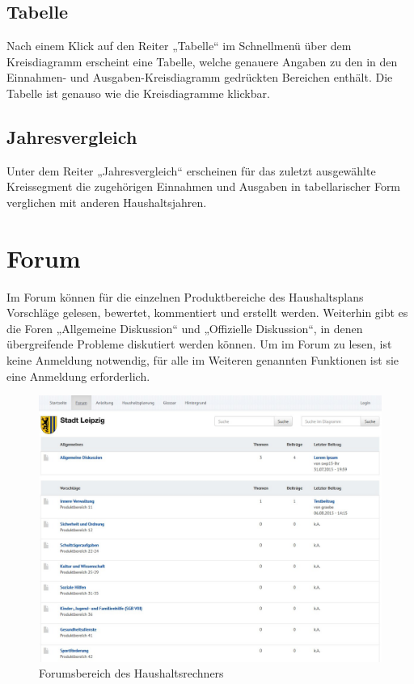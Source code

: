 \documentclass[a4paper,11pt,twoside]{article}
\begin{document}
\subsection{Tabelle}
Nach einem Klick auf den Reiter „Tabelle“ im Schnellmenü über dem
Kreisdiagramm erscheint eine Tabelle, welche genauere Angaben zu den in den
Einnahmen- und Ausgaben-Kreisdiagramm gedr\"uckten Bereichen enth\"alt. Die
Tabelle ist genauso wie die Kreisdiagramme klickbar.

\subsection{Jahresvergleich}
Unter dem Reiter „Jahresvergleich“ erscheinen für das zuletzt ausgewählte
Kreissegment die zugehörigen Einnahmen und Ausgaben in tabellarischer Form
verglichen mit anderen Haushaltsjahren.

\section{Forum}
Im Forum k\"onnen f\"ur die einzelnen Produktbereiche des Haushaltsplans
Vorschl\"age gelesen, bewertet, kommentiert und erstellt werden. Weiterhin
gibt es die Foren „Allgemeine Diskussion“ und „Offizielle Diskussion“, in
denen übergreifende Probleme diskutiert werden können. Um im Forum zu lesen,
ist keine Anmeldung notwendig, f\"ur alle im Weiteren genannten Funktionen ist
sie eine Anmeldung erforderlich.

\begin{figure}[ht]
\begin{center}
  \includegraphics[width=\textwidth]{Bilder/forum.jpg}
\end{center}
  \caption{Forumsbereich des Haushaltsrechners}
\end{figure}
\end{document}
